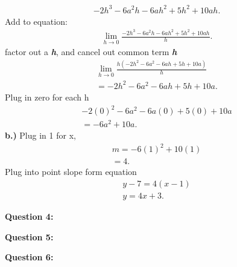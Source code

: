 \documentclass{report}
\begin{document}
    \begin{align*}
        -2h^3-6a^2h-6ah^2+5h^2+10ah
    .\end{align*}
    \bigbreak \noindent 
    Add to equation:
    \begin{align*}
        \lim\limits_{h \to 0}{ \frac{-2h^3-6a^2h-6ah^2+5h^2+10ah}{h}}
    .\end{align*}
    \bigbreak \noindent 
    factor out a \textbf{\textit{h}}, and cancel out common term \textbf{\textit{h}}
    \begin{align*}
        \lim\limits_{h \to 0}{ \frac{h \left(-2h^2-6a^2-6ah+5h+10a\right)}{h}} \\
        =-2h^2-6a^2-6ah+5h+10a 
    .\end{align*}
    \bigbreak \noindent 
    Plug in zero for each h
    \begin{align*}
        -2 \left(0\right)^2-6a^2-6a \left(0\right) + 5 \left(0\right)+10a \\
        = -6a^2+10a
    .\end{align*}
    \bigbreak \noindent \bigbreak \noindent 
    \textbf{b.)}
    Plug in 1 for x,
    \begin{align*}
        m = -6 \left(1\right)^2 + 10 \left(1\right) \\ 
        = 4
    .\end{align*}
    \bigbreak \noindent 
    Plug into point slope form equation 
    \begin{align*}
        y - 7 = 4 \left(x - 1\right) \\ 
        y = 4x+3
    .\end{align*}

    \bigbreak \noindent \bigbreak \noindent \bigbreak \noindent 
    \begin{Large}
       \textbf{Question 4:}
    \end{Large}
    \bigbreak \noindent 
    \bigbreak \noindent 

    \bigbreak \noindent \bigbreak \noindent \bigbreak \noindent 
    \begin{Large}
        \textbf{Question 5:}
    \end{Large}
    \bigbreak \noindent 
    \bigbreak \noindent 

    \bigbreak \noindent \bigbreak \noindent \bigbreak \noindent 
    \begin{Large}
        \textbf{Question 6:}
    \end{Large}
    \bigbreak \noindent 
    \bigbreak \noindent 
\end{document}
